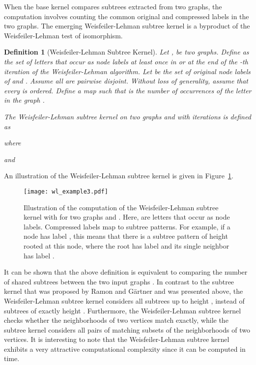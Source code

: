 \documentclass[twoside,11pt]{article}
\newtheorem{definition}{Definition}
\begin{document}
When the base kernel compares subtrees extracted from two graphs, the computation involves counting the common original and compressed labels in the two graphs.
The emerging Weisfeiler-Lehman subtree kernel is a byproduct of the Weisfeiler-Lehman test of isomorphism.
\begin{definition}[Weisfeiler-Lehman Subtree Kernel]
  Let ,  be two graphs.
  Define  as the set of letters that occur as node labels at least once in  or  at the end of the -th iteration of the Weisfeiler-Lehman algorithm.
  Let  be the set of original node labels of  and .
  Assume all  are pairwise disjoint.
  Without loss of generality, assume that every  is ordered.
  Define a map  such that  is the number of occurrences of the letter  in the graph .

  The Weisfeiler-Lehman subtree kernel on two graphs  and  with  iterations is defined as
  
  where
  
  and
  
\end{definition}
An illustration of the Weisfeiler-Lehman subtree kernel is given in Figure~\ref{fig:wl_example}.
\begin{figure}[t]
    \centering
    \texttt{[image: wl\_example3.pdf]}
    \caption{Illustration of the computation of the Weisfeiler-Lehman subtree kernel with  for two  graphs  and . Here,  are letters that occur as node labels. Compressed labels map to subtree patterns. For example, if a node has label , this means that there is a subtree pattern of height  rooted at this node, where the root has label  and its single neighbor has label .}
    \label{fig:wl_example}
\end{figure}
It can be shown that the above definition is equivalent to comparing the number of shared subtrees between the two input graphs .
In contrast to the subtree kernel that was proposed by Ramon and G{\"a}rtner and was presented above, the Weisfeiler-Lehman subtree kernel considers all subtrees up to height , instead of subtrees of exactly height .
Furthermore, the Weisfeiler-Lehman subtree kernel checks whether the neighborhoods of two vertices match exactly, while the subtree kernel considers all pairs of matching subsets of the neighborhoods of two vertices.
It is interesting to note that the Weisfeiler-Lehman subtree kernel exhibits a very attractive computational complexity since it can be computed in  time.
\end{document}

